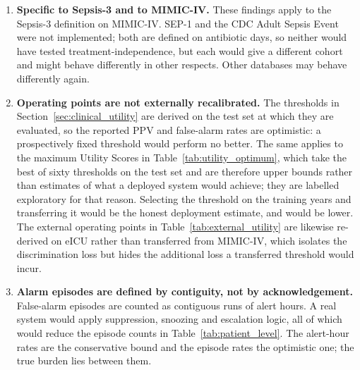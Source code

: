\begin{enumerate}
    \item \textbf{Specific to Sepsis-3 and to MIMIC-IV.} These findings apply
    to the Sepsis-3 definition on MIMIC-IV. SEP-1 and the CDC Adult Sepsis Event
    were not implemented; both are defined on antibiotic days, so neither would
    have tested treatment-independence, but each would give a different cohort
    and might behave differently in other respects. Other databases may behave
    differently again.

    \item \textbf{Operating points are not externally recalibrated.} The
    thresholds in Section~\ref{sec:clinical_utility} are derived on the test
    set at which they are evaluated, so the reported PPV and false-alarm rates
    are optimistic: a prospectively fixed threshold would perform no better.
    The same applies to the maximum Utility Scores in
    Table~\ref{tab:utility_optimum}, which take the best of sixty thresholds on
    the test set and are therefore upper bounds rather than estimates of what a
    deployed system would achieve; they are labelled exploratory for that
    reason. Selecting the threshold on the training years and transferring it
    would be the honest deployment estimate, and would be lower.
    The external operating points in Table~\ref{tab:external_utility} are
    likewise re-derived on eICU rather than transferred from MIMIC-IV, which
    isolates the discrimination loss but hides the additional loss a
    transferred threshold would incur.

    \item \textbf{Alarm episodes are defined by contiguity, not by
    acknowledgement.} False-alarm episodes are counted as contiguous runs of
    alert hours. A real system would apply suppression, snoozing and
    escalation logic, all of which would reduce the episode counts in
    Table~\ref{tab:patient_level}. The alert-hour rates are the conservative
    bound and the episode rates the optimistic one; the true burden lies
    between them.


\end{enumerate}
